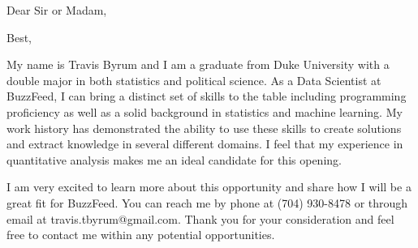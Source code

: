 \documentclass[10pt,a4paper,sans]{moderncv}        %
\begin{document}





\clearpage
\opening{Dear Sir or Madam,}
\closing{Best,}
\makelettertitle

My name is Travis Byrum and I am a graduate from Duke University with a double major in both statistics and political science. As a Data Scientist at BuzzFeed, I can bring a distinct set of skills to the table including programming proficiency as well as a solid background in statistics and machine learning. My work history has demonstrated the ability to use these skills to create solutions and extract knowledge in several different domains. I feel that my experience in quantitative analysis makes me an ideal candidate for this opening.

I am very excited to learn more about this opportunity and share how I will be a great fit for BuzzFeed. You can reach me by phone at (704) 930-8478 or through email at travis.tbyrum@gmail.com. Thank you for your consideration and feel free to contact me within any potential opportunities.

\makeletterclosing

\end{document}
